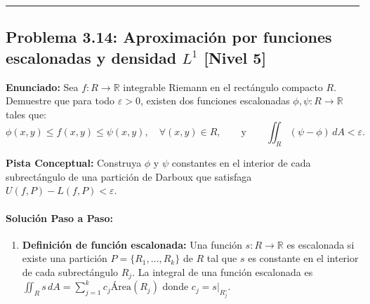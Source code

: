 \documentclass[11pt,a4paper]{article}
\begin{document}
\vspace{0.5cm}
\hrule
\vspace{0.5cm}

\subsection*{Problema 3.14: Aproximación por funciones escalonadas y densidad $L^1$ \hfill \color{primaryblue}\small[Nivel 5]}

\begin{tcolorbox}[colback=white,colframe=gray!40,arc=1mm,boxrule=0.5pt,left=3mm,right=3mm,top=2mm,bottom=2mm]
\textbf{Enunciado:} Sea $f: R \to \mathbb{R}$ integrable Riemann en el rectángulo compacto $R$. Demuestre que para todo $\varepsilon > 0$, existen dos funciones escalonadas $\phi, \psi: R \to \mathbb{R}$ tales que:
\begin{equation*}
\phi(x,y) \le f(x,y) \le \psi(x,y), \quad \forall (x,y) \in R, \qquad \text{y} \qquad \iint_R (\psi - \phi) \, dA < \varepsilon.
\end{equation*}
\end{tcolorbox}

\begin{tcolorbox}[colback=yellow!4,colframe=accentamber!70,arc=1mm,boxrule=0.5pt,left=3mm,right=3mm,top=1.5mm,bottom=1.5mm]
\textbf{Pista Conceptual:} Construya $\phi$ y $\psi$ constantes en el interior de cada subrectángulo de una partición de Darboux que satisfaga $U(f,P) - L(f,P) < \varepsilon$.
\end{tcolorbox}

\paragraph{Solución Paso a Paso:}\par
\begin{enumerate}[label=\textbf{\arabic*.}]
\item \textbf{Definición de función escalonada:}
Una función $s: R \to \mathbb{R}$ es escalonada si existe una partición $P = \{R_1, \dots, R_k\}$ de $R$ tal que $s$ es constante en el interior de cada subrectángulo $R_j$.
La integral de una función escalonada es $\iint_R s \, dA = \sum_{j=1}^k c_j \text{Área}(R_j)$ donde $c_j = s|_{R_j^\circ}$.
\end{enumerate}
\end{document}
